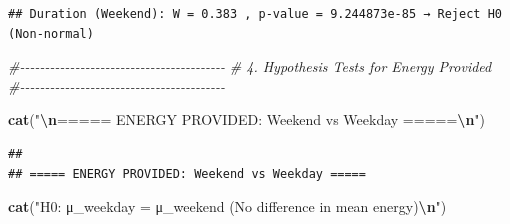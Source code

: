 \documentclass[
  12pt,
]{article}
\newenvironment{Shaded}{\begin{snugshade}}{\end{snugshade}}
\newcommand{\AttributeTok}[1]{\textcolor[rgb]{0.13,0.29,0.53}{#1}}
\newcommand{\CommentTok}[1]{\textcolor[rgb]{0.56,0.35,0.01}{\textit{#1}}}
\newcommand{\ConstantTok}[1]{\textcolor[rgb]{0.56,0.35,0.01}{#1}}
\newcommand{\DecValTok}[1]{\textcolor[rgb]{0.00,0.00,0.81}{#1}}
\newcommand{\FunctionTok}[1]{\textcolor[rgb]{0.13,0.29,0.53}{\textbf{#1}}}
\newcommand{\NormalTok}[1]{#1}
\newcommand{\SpecialCharTok}[1]{\textcolor[rgb]{0.81,0.36,0.00}{\textbf{#1}}}
\newcommand{\StringTok}[1]{\textcolor[rgb]{0.31,0.60,0.02}{#1}}
\begin{document}
\begin{Shaded}
\end{Shaded}

\begin{verbatim}
## Duration (Weekend): W = 0.383 , p-value = 9.244873e-85 → Reject H0 (Non-normal)
\end{verbatim}

\begin{Shaded}
\begin{Highlighting}[]
\CommentTok{\#{-}{-}{-}{-}{-}{-}{-}{-}{-}{-}{-}{-}{-}{-}{-}{-}{-}{-}{-}{-}{-}{-}{-}{-}{-}{-}{-}{-}{-}{-}{-}{-}{-}{-}{-}{-}{-}{-}{-}{-}{-}}
\CommentTok{\# 4. Hypothesis Tests for Energy Provided}
\CommentTok{\#{-}{-}{-}{-}{-}{-}{-}{-}{-}{-}{-}{-}{-}{-}{-}{-}{-}{-}{-}{-}{-}{-}{-}{-}{-}{-}{-}{-}{-}{-}{-}{-}{-}{-}{-}{-}{-}{-}{-}{-}{-}}

\FunctionTok{cat}\NormalTok{(}\StringTok{"}\SpecialCharTok{\textbackslash{}n}\StringTok{===== ENERGY PROVIDED: Weekend vs Weekday =====}\SpecialCharTok{\textbackslash{}n}\StringTok{"}\NormalTok{)}
\end{Highlighting}
\end{Shaded}

\begin{verbatim}
## 
## ===== ENERGY PROVIDED: Weekend vs Weekday =====
\end{verbatim}

\begin{Shaded}
\begin{Highlighting}[]
\FunctionTok{cat}\NormalTok{(}\StringTok{"H0: μ\_weekday = μ\_weekend (No difference in mean energy)}\SpecialCharTok{\textbackslash{}n}\StringTok{"}\NormalTok{)}
\end{Highlighting}
\end{Shaded}
\end{document}
